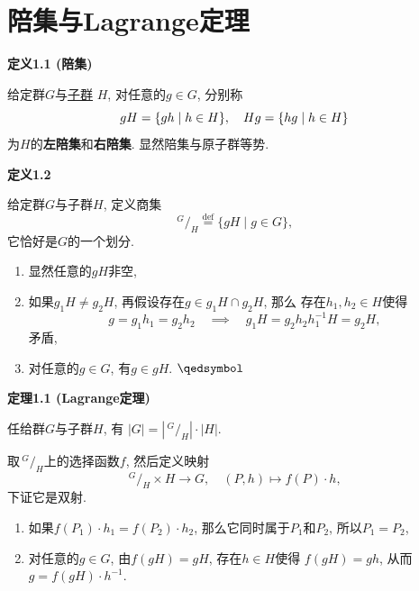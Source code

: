 \documentclass[UTF8]{ctexart}
\begin{document}
\setlength{\abovedisplayskip}{1pt}
\setlength{\belowdisplayskip}{1pt}

\section{陪集与Lagrange定理}

\hypertarget{sec:定义1.1}{}
\noindent\textbf{定义1.1 (陪集)}

给定群$G$与\href{02 子群#nameddest=sec:定义1.1}{子群} $H$,
对任意的$g\in G$, 分别称
\[
    gH=\{gh\mid h\in H\},\quad Hg=\{hg\mid h\in H\}\\[1pt]
\]
为$H$的\textbf{左陪集}和\textbf{右陪集}. 显然陪集与原子群等势.

\vspace{10pt}

\hypertarget{sec:定义1.2}{}
\noindent\textbf{定义1.2}

给定群$G$与子群$H$, 定义商集
\[
    \,\!^{\displaystyle G}\!/_{\displaystyle H}
    \overset{\mathrm{def}}{=}\{gH\mid g\in G\},
\]
它恰好是$G$的一个划分.


\begin{enumerate}
    \item 显然任意的$gH$非空,
    \item 如果$g_1H\neq g_2H$, 再假设存在$g\in g_1H\cap g_2H$, 那么
    存在$h_1,h_2\in H$使得
    \[
        g=g_1h_1=g_2h_2\quad\implies\quad g_1H=g_2h_2h_1^{-1}H=g_2H,
    \]
    矛盾,
    \item 对任意的$g\in G$, 有$g\in gH$. \hfill $\qedsymbol$
\end{enumerate}

\vspace{15pt}

\hypertarget{sec:定理1.1}{}
\noindent\textbf{定理1.1 (Lagrange定理)}

任给群$G$与子群$H$, 有
$|G|=\left|\,\!^{\displaystyle G}\!/_{\displaystyle H}\right|\cdot|H|$.

\vspace{3pt}

\vspace{3pt}
取$\,\!^{\displaystyle G}\!/_{\displaystyle H}$上的选择函数$f$,
然后定义映射
\vspace{3pt}
\[
    \,\!^{\displaystyle G}\!/_{\displaystyle H}\times H\to G,\quad
    (P,h)\mapsto f(P)\cdot h,
\]
下证它是双射.

\begin{enumerate}
    \item 如果$f(P_1)\cdot h_1=f(P_2)\cdot h_2$,
    那么它同时属于$P_1$和$P_2$, 所以$P_1=P_2$,
    \vspace{3pt}
    \item 对任意的$g\in G$, 由$f(gH)=gH$, 存在$h\in H$使得
    $f(gH)=gh$, 从而$g=f(gH)\cdot h^{-1}$.
\end{enumerate}
\end{document}
